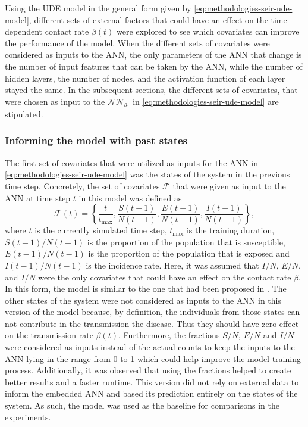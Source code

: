 Using the \gls{UDE} model in the general form given by \autoref{eq:methodologies-seir-ude-model}, different sets of external factors that could have an effect on the time-dependent contact rate $\beta (t)$ were explored to see which covariates can improve the performance of the model.
When the different sets of covariates were considered as inputs to the \gls{ANN}, the only parameters of the \gls{ANN} that change is the number of input features that can be taken by the \gls{ANN}, while the number of hidden layers, the number of nodes, and the activation function of each layer stayed the same.
In the subsequent sections, the different sets of covariates, that were chosen as input to the $\mathcal{NN}_{\theta_1}$ in \autoref{eq:methodologies-seir-ude-model} are stipulated.

\subsubsection{Informing the model with past states}
The first set of covariates that were utilized as inputs for the \gls{ANN} in \autoref{eq:methodologies-seir-ude-model} was the states of the system in the previous time step.
Concretely, the set of covariates $\mathcal{F}$ that were given as input to the \gls{ANN} at time step $t$ in this model was defined as
\begin{equation}
    \mathcal{F}(t) = \left\lbrace \frac{t}{t_\text{max}}, \frac{S(t-1)}{N(t-1)}, \frac{E(t-1)}{N(t-1)}, \frac{I(t-1)}{N(t-1)} \right\rbrace,
\end{equation}
where $t$ is the currently simulated time step, $t_\text{max}$ is the training duration, $S(t-1)/N(t-1)$ is the proportion of the population that is susceptible, $E(t-1)/N(t-1)$ is the proportion of the population that is exposed and $I(t-1)/N(t-1)$ is the incidence rate.
Here, it was assumed that $I/N$, $E/N$, and $I/N$ were the only covariates that could have an effect on the contact rate $\beta$.
In this form, the model is similar to the one that had been proposed in \cite{dandekarMachineLearningAidedGlobal2020a}.
The other states of the system were not considered as inputs to the \gls{ANN} in this version of the model because, by definition, the individuals from those states can not contribute in the transmission the disease.
Thus they should have zero effect on the transmission rate $\beta(t)$.
Furthermore, the fractions $S/N$, $E/N$ and $I/N$ were considered as inputs instead of the actual counts to keep the inputs to the \gls{ANN} lying in the range from 0 to 1 which could help improve the model training process.
Additionally, it was observed that using the fractions helped to create better results and a faster runtime.
This version did not rely on external data to inform the embedded \gls{ANN} and based its prediction entirely on the states of the system.
As such, the model was used as the baseline for comparisons in the experiments.

